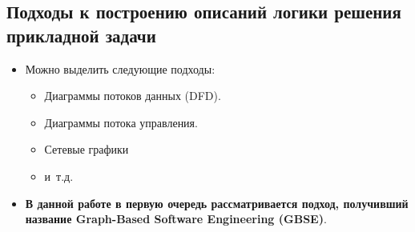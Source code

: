 \subsection{Подходы к построению описаний логики решения прикладной задачи}
\begin{frame}
  \begin{itemize}
    \item Можно выделить следующие подходы:
          \begin{itemize}
            \item Диаграммы потоков данных (DFD).
            \item Диаграммы потока управления.
            \item Сетевые графики
            \item и~т.д.
          \end{itemize}
          \vspace{0.05\textheight}
    \item \textbf{В данной работе в первую очередь рассматривается подход, получивший название Graph-Based Software Engineering (GBSE)}.
  \end{itemize}

\end{frame}



